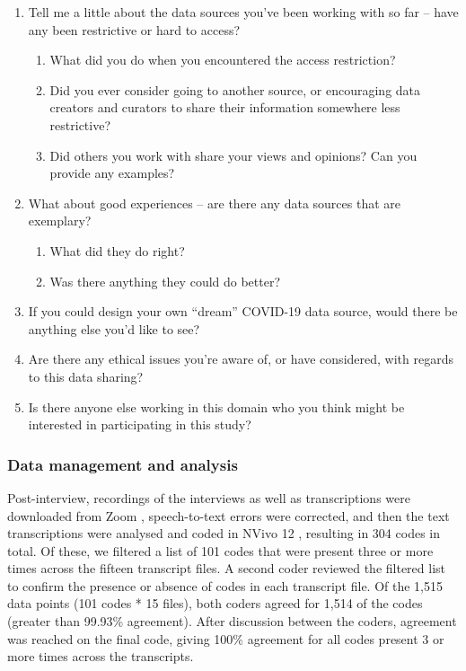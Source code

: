 \documentclass{CUP-JNL-DAP}%
\begin{document}
\begin{enumerate}
\item Tell me a little about the data sources you've been working with so far – have any been restrictive or hard to access?
\begin{enumerate}
\item What did you do when you encountered the access restriction?
\item Did you ever consider going to another source, or encouraging data creators and curators to share their information somewhere less restrictive?
\item Did others you work with share your views and opinions? Can you provide any examples?
\end{enumerate}
\item What about good experiences – are there any data sources that are exemplary? 
\begin{enumerate}
\item What did they do right?
\item Was there anything they could do better?
\end{enumerate}
\item If you could design your own “dream” COVID-19 data source, would there be anything
else you’d like to see?
\item Are there any ethical issues you’re aware of, or have considered, with regards to this
data sharing?
\item Is there anyone else working in this domain who you think might be interested in
participating in this study?
\end{enumerate}

\subsubsection{Data management and analysis}
Post-interview, recordings of the interviews as well as transcriptions were downloaded from Zoom \cite{zoom_2022}, speech-to-text errors were corrected, and then the text transcriptions were analysed and coded in NVivo 12 \cite{qsr_international_pty_ltd_nvivo_2018}, resulting in 304 codes in total. Of these, we filtered a list of 101 codes that were present three or more times across the fifteen transcript files. A second coder reviewed the filtered list to confirm the presence or absence of codes in each transcript file. Of the 1,515 data points (101 codes * 15 files), both coders agreed for 1,514 of the codes (greater than 99.93\% agreement). After discussion between the coders, agreement was reached on the final code, giving 100\% agreement for all codes present 3 or more times across the transcripts. 
\end{document}
